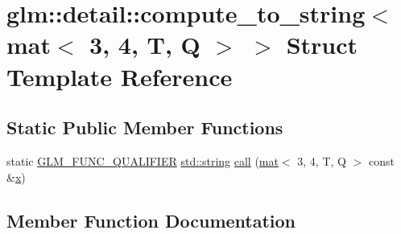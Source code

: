 \hypertarget{structglm_1_1detail_1_1compute__to__string_3_01mat_3_013_00_014_00_01_t_00_01_q_01_4_01_4}{}\section{glm\+:\+:detail\+:\+:compute\+\_\+to\+\_\+string$<$ mat$<$ 3, 4, T, Q $>$ $>$ Struct Template Reference}
\label{structglm_1_1detail_1_1compute__to__string_3_01mat_3_013_00_014_00_01_t_00_01_q_01_4_01_4}
\subsection*{Static Public Member Functions}
\begin{DoxyCompactItemize}
\item 
static \mbox{\hyperlink{setup_8hpp_a33fdea6f91c5f834105f7415e2a64407}{G\+L\+M\+\_\+\+F\+U\+N\+C\+\_\+\+Q\+U\+A\+L\+I\+F\+I\+ER}} \mbox{\hyperlink{_s_d_l__opengl__glext_8h_ae84541b4f3d8e1ea24ec0f466a8c568b}{std\+::string}} \mbox{\hyperlink{structglm_1_1detail_1_1compute__to__string_3_01mat_3_013_00_014_00_01_t_00_01_q_01_4_01_4_ae80e1ea4b5f28839ab5e906afe2811c2}{call}} (\mbox{\hyperlink{structglm_1_1mat}{mat}}$<$ 3, 4, T, Q $>$ const \&\mbox{\hyperlink{_s_d_l__opengl_8h_ad0e63d0edcdbd3d79554076bf309fd47}{x}})
\end{DoxyCompactItemize}


\subsection{Member Function Documentation}
\mbox{\label{structglm_1_1detail_1_1compute__to__string_3_01mat_3_013_00_014_00_01_t_00_01_q_01_4_01_4_ae80e1ea4b5f28839ab5e906afe2811c2}} 

